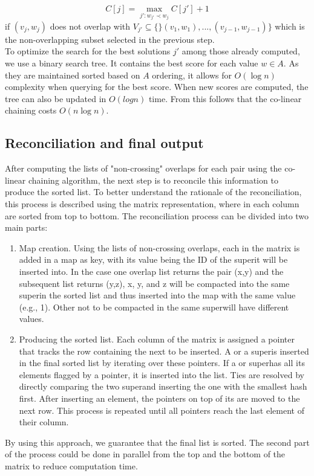 \begin{equation} 
C[j] = \max_{j':w_{j'} \prec w_j} C[j'] + 1
\end{equation}
if $(v_j,w_j)$ does not overlap with $ V_{j'} \subseteq \{\}(v_1,w_1),...,(v_{j-1},w_{j-1})\}$ which is the non-overlapping subset selected in the previous step.\\
To optimize the search for the best solutions $j'$ among those already computed, we use a binary search tree. It contains the best score for each value $w \in A$. As they are maintained sorted based on $A$ ordering, it allows for $O(\log{n})$ complexity when querying for the best score. When new scores are computed, the tree can also be updated in $O(log{n})$ time. From this follows that the co-linear chaining costs $O(n\log{n})$.

\subsection{Reconciliation and final output}
After computing the lists of "non-crossing" overlaps for each pair using the co-linear chaining algorithm, the next step is to reconcile this information to produce the sorted list. To better understand the rationale of the reconciliation, this process is described using the matrix representation, where \kmers in each column are sorted from top to bottom. The reconciliation process can be divided into two main parts:
\begin{enumerate}
	\item Map creation. Using the lists of non-crossing overlaps, each \kmer in the matrix is added in a map as key, with its value being the ID of the super\kmer it will be inserted into. In the case one overlap list returns the pair (x,y) and the subsequent list returns (y,z), \kmers x, y, and z will be compacted into the same super\kmer in the sorted list and thus inserted into the map with the same value (e.g., 1). Other \kmers not to be compacted in the same super\kmer will have different values.
	\item Producing the sorted list. Each column of the matrix is assigned a pointer that tracks the row containing the next \kmer to be inserted. A \kmer or a super\kmer is inserted in the final sorted list by iterating over these pointers. If a \kmer or super\kmer has all its elements flagged by a pointer, it is inserted into the list. Ties are resolved by directly comparing the two super\kmers and inserting the one with the smallest hash first. After inserting an element, the pointers on top of its \kmers are moved to the next row. This process is repeated until all pointers reach the last element of their column.
\end{enumerate}
By using this approach, we guarantee that the final list is sorted. The second part of the process could be done in parallel from the top and the bottom of the matrix to reduce computation time.

